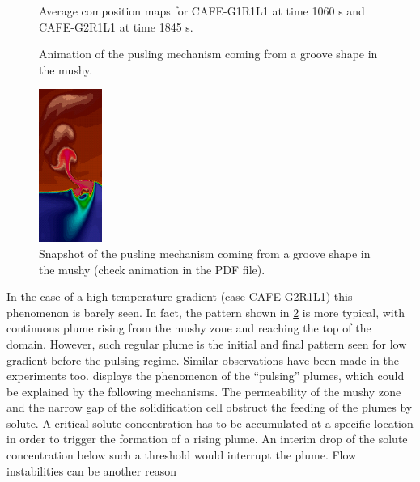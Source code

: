 \begin{figure}[htbp]
\begin{subfigure}{0.4\textwidth}
	\caption{}
    \label{fig:cafe_VG2}
  \end{subfigure}
\caption{Average composition maps for CAFE-G1R1L1 at time 1060 s and CAFE-G2R1L1 at time 1845 s.} 
\label{fig:cafe_G1G2}
\end{figure}
%
\begin{figure}[htbp]
\centering
%
%
	{%
		\caption{Animation of the pusling mechanism coming from a groove shape in the mushy.}
	}
	{%
		\includegraphics[height=5cm]{Chapter3/Graphics/freckle_cafe/anim_pulsing/img2.png}
		\caption{Snapshot of the pusling mechanism coming from a groove shape in the mushy (check animation in the PDF file).} 
	}
\label{fig:animate_cafeVG1}
\end{figure}
%
In the case of a high temperature gradient (case CAFE-G2R1L1) this phenomenon is 
barely seen. In fact, the pattern shown in \cref{fig:cafe_G1G2} is more typical, with continuous plume rising from the mushy 
zone and reaching the top of the domain. However, such regular plume is the initial and final pattern seen for low 
gradient before the pulsing regime. Similar observations have been made in the experiments too.  displays 
the phenomenon of the “pulsing” plumes, which could be explained by the following mechanisms. The permeability of the 
mushy zone and the narrow gap of the solidification cell obstruct the feeding of the plumes by solute. A critical solute 
concentration has to be accumulated at a specific location in order to trigger the formation of a rising plume. An interim 
drop of the solute concentration below such a threshold would interrupt the plume. Flow instabilities can be another reason 
